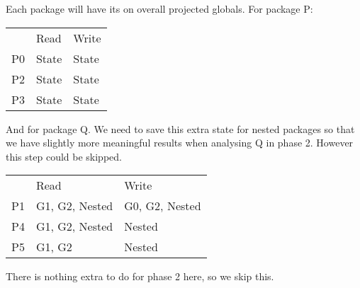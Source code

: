 \documentclass{article}
\begin{document}
\noindent
Each package will have its on overall projected globals. For package P:

\begin{center}
  \begin{tabular}{lll}
       & Read           & Write              \\
    P0 & State          & State              \\
    P2 & State          & State              \\
    P3 & State          & State              \\
  \end{tabular}
\end{center}

\noindent
And for package Q. We need to save this extra state for nested packages so
that we have slightly more meaningful results when analysing Q in phase 2.
However this step could be skipped.

\begin{center}
  \begin{tabular}{lll}
       & Read           & Write              \\
    P1 & G1, G2, Nested & G0, G2, Nested     \\
    P4 & G1, G2, Nested & Nested             \\
    P5 & G1, G2         & Nested             \\
  \end{tabular}
\end{center}

\noindent
There is nothing extra to do for phase 2 here, so we skip this.
\end{document}
